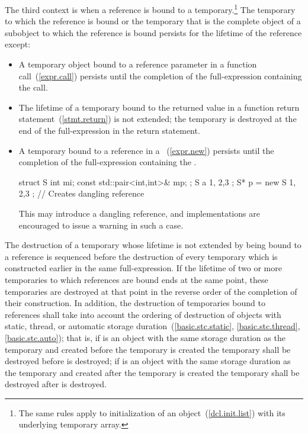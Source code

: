 \pnum
The third context is when a reference is bound to a
temporary.\footnote{The same rules apply to initialization of an
   object~(\ref{dcl.init.list}) with its
  underlying temporary array.}
The temporary to which the reference is bound or the temporary
that is the complete object of a subobject to which the reference is bound
persists for the lifetime of the reference except:

\begin{itemize}
\item A temporary object bound to a reference parameter in a function call~(\ref{expr.call})
persists until the completion of the full-expression containing the call.

\item The lifetime of a temporary bound to the returned value in a function return statement~(\ref{stmt.return}) is not extended; the temporary is destroyed at the end of the full-expression in the return statement.

\item A temporary bound to a reference in a ~(\ref{expr.new}) persists until the completion of the full-expression containing the . \begin{example}
\begin{codeblock}
struct S { int mi; const std::pair<int,int>& mp; };
S a { 1, {2,3} };
S* p = new S{ 1, {2,3} };   // Creates dangling reference
\end{codeblock}
\end{example} \begin{note} This may introduce a dangling reference, and implementations are encouraged to issue a warning in such a case. \end{note}
\end{itemize}

\pnum
The destruction of a temporary whose lifetime is not extended by being
bound to a reference is sequenced before the destruction of every
temporary which is constructed earlier in the same full-expression.
If the lifetime of two or more temporaries to which references are bound ends
at the same point,
these temporaries are destroyed at that point in the reverse order of the
completion of their construction.
In addition, the destruction of temporaries bound to references shall
take into account the ordering of destruction of objects with static, thread, or
automatic storage duration~(\ref{basic.stc.static}, \ref{basic.stc.thread}, \ref{basic.stc.auto});
that is, if
is an object with the same storage duration as the temporary and
created before the temporary is created 
the temporary shall be destroyed before
is destroyed;
if
is an object with the same storage duration as the temporary and
created after the temporary is created
the temporary shall be destroyed after
is destroyed.

